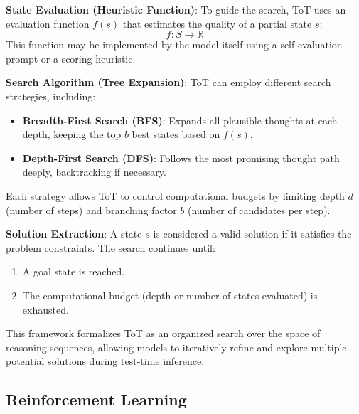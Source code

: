 \textbf{State Evaluation (Heuristic Function)}: To guide the search, ToT uses an evaluation function $f(s)$ that estimates the quality of a partial state $s$:
\begin{equation}
    f: S \rightarrow \mathbb{R}
\end{equation}
This function may be implemented by the model itself using a self-evaluation prompt or a scoring heuristic.

\textbf{Search Algorithm (Tree Expansion)}: ToT can employ different search strategies, including:
\begin{itemize}
    \item \textbf{Breadth-First Search (BFS)}: Expands all plausible thoughts at each depth, keeping the top $b$ best states based on $f(s)$.
    \item \textbf{Depth-First Search (DFS)}: Follows the most promising thought path deeply, backtracking if necessary.
\end{itemize}

Each strategy allows ToT to control computational budgets by limiting depth $d$ (number of steps) and branching factor $b$ (number of candidates per step).

\textbf{Solution Extraction}: A state $s$ is considered a valid solution if it satisfies the problem constraints. The search continues until:
\begin{enumerate}
    \item A goal state is reached.
    \item The computational budget (depth or number of states evaluated) is exhausted.
\end{enumerate}

This framework formalizes ToT as an organized search over the space of reasoning sequences, allowing models to iteratively refine and explore multiple potential solutions during test-time inference.

\subsection{Reinforcement Learning}

